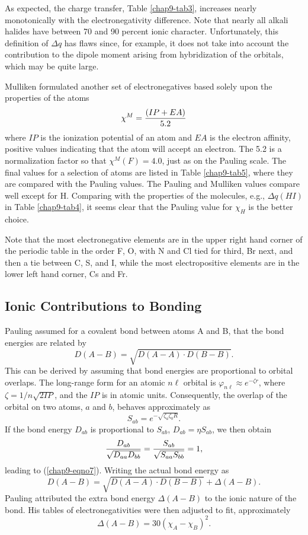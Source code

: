As expected, the charge transfer, Table \ref{chap9-tab3}, increases
nearly monotonically with the electronegativity difference. Note that
nearly all alkali halides have between 70 and 90 percent ionic
character. Unfortunately, this definition of $\Delta q$ has flaws
since, for example, it does not take into account the contribution to
the dipole moment arising from hybridization of the orbitals, which
may be quite large.

Mulliken formulated another set of electronegatives based solely upon the 
properties of the atoms
$$
\chi^M = {(IP + EA) \over 5.2}
$$
where $IP$ is the ionization potential of an atom and $EA$ is the
electron affinity, positive values indicating that the atom will
accept an electron. The 5.2 is a normalization factor so that
$\chi^M(F) = 4.0$, just as on the Pauling scale.  The final values for
a selection of atoms are listed in Table \ref{chap9-tab5}, where they
are compared with the Pauling values. The Pauling and Mulliken values
compare well except for H.  Comparing with the properties of the
molecules, e.g., $\Delta q(HI)$ in Table \ref{chap9-tab4}, it seems
clear that the Pauling value for $\chi_H$ is the better choice.

Note that the most electronegative elements are in the upper right hand 
corner of the periodic table in the order F, O, with N and Cl tied for 
third, Br next, and then a tie between C, S, and I, while the most 
electropositive elements are in the lower left hand corner, Cs and Fr.

\subsection{Ionic Contributions to Bonding}

Pauling assumed for a covalent bond between atoms A and B, that the bond
energies are related by
$$
D(A - B) = \sqrt{D(A-A) \cdot D(B-B)}.
\label{chap9-eqno7}
$$
This can be derived by assuming that bond energies are proportional to 
orbital overlaps.  The long-range form for an atomic $n \ell$ orbital 
is $\varphi_{n \ell} \approx e^{- \zeta r}$, where $\zeta = 1/n 
\sqrt{2IP}$, and the $IP$ is in atomic units.  Consequently, the 
overlap of the orbital on two atoms, $a$ and $b$, behaves approximately as
$$
S_{ab}  = e^{-\sqrt{\zeta_a \zeta_b R}}.
$$
If the bond energy $D_{ab}$ is proportional to $S_{ab}$, $D_{ab} = 
\eta S_{ab}$, we then obtain
$$
{D_{ab} \over \sqrt{D_{aa} D_{bb}}} = {S_{ab} \over \sqrt{S_{aa} 
S_{bb}}} = 1,
$$
leading to (\ref{chap9-eqno7}).  Writing the actual bond energy as
$$
D(A-B) = \sqrt{D(A-A) \cdot D(B-B)} + \Delta (A-B).
\label{chap9-eqno8}
$$
Pauling attributed the extra bond energy $\Delta (A-B)$ to the ionic nature 
of the bond. His tables of electronegativities were then adjusted to 
fit, approximately
$$
\Delta (A-B ) = 30 ( \chi_A - \chi_B)^2.
\label{chap9-eqno9}
$$

